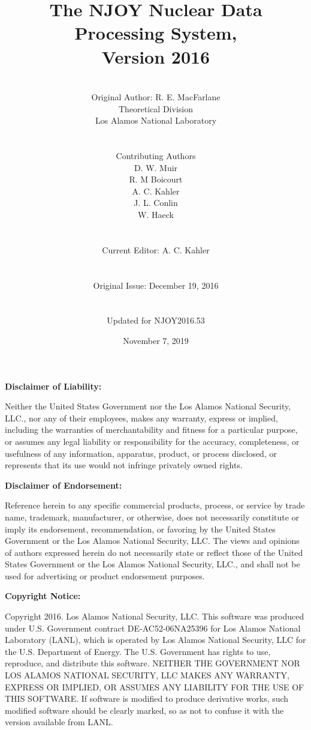 \documentclass[11pt,twoside]{NJOYMan}
\title{\bf The NJOY Nuclear Data Processing System,\\Version 2016}
\author{\\
  Original Author:  R. E. MacFarlane\\
  Theoretical Division\\
  Los Alamos National Laboratory\\
\\
\\
Contributing Authors\\
D. W. Muir\\
R. M Boicourt\\
A. C. Kahler\\
J. L. Conlin\\
W. Haeck\\
\\
\\
Current Editor:  A. C. Kahler\\
\\
\\
Original Issue:  December 19, 2016\\
\\
\\
Updated for NJOY2016.53
\\}
\date{November 7, 2019}
\renewcommand{\headrulewidth}{0pt}     %
\renewcommand{\footrulewidth}{0pt}}    %
\begin{document}
\maketitle
{}

\clearpage
\fancyhf{}                           %
%
\renewcommand{\headrulewidth}{0pt}   %
\renewcommand{\footrulewidth}{0pt}   %

%
\begin{center} \textbf{Disclaimer of Liability:} \end{center}
Neither the United States Government nor the Los Alamos
National Security, LLC., nor any of their employees, makes any warranty,
express or implied, including the warranties of merchantability and
fitness for a particular purpose, or assumes any legal liability or
responsibility for the accuracy, completeness, or usefulness of any
information, apparatus, product, or process disclosed, or represents
that its use would not infringe privately owned rights.

\vspace{0.25in}
\begin{center} \textbf{Disclaimer of Endorsement:} \end{center}
Reference herein to any specific commercial products,
process, or service by trade name, trademark, manufacturer, or otherwise,
does not necessarily constitute or imply its endorsement, recommendation,
or favoring by the United States Government or the Los Alamos National
Security, LLC. The views and opinions of authors expressed herein do not
necessarily state or reflect those of the United States Government or
the Los Alamos National Security, LLC., and shall not be used for
advertising or product endorsement purposes.

\vspace{0.25in}
\begin{center} \textbf{Copyright Notice:} \end{center}
Copyright 2016. Los Alamos National Security, LLC. This software was
produced under U.S. Government contract DE-AC52-06NA25396 for
Los Alamos National Laboratory (LANL), which is operated by
Los Alamos National Security, LLC for the U.S. Department of
Energy. The U.S. Government has rights to use, reproduce, and
distribute this software.  NEITHER THE GOVERNMENT NOR LOS ALAMOS
NATIONAL SECURITY, LLC MAKES ANY WARRANTY, EXPRESS OR IMPLIED, OR
ASSUMES ANY LIABILITY FOR THE USE OF THIS SOFTWARE.  If software
is modified to produce derivative works, such modified software
should be clearly marked, so as not to confuse it with the version
available from LANL.
\end{document}
